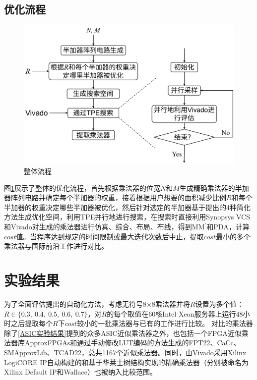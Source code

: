 \subsection{优化流程}


\begin{figure}[!htbp]
    \centering
    \includegraphics[width=0.8\linewidth]{./figs/AC-AM-FPGA-AMG-flow.pdf}
    \caption{整体流程}
    \label{AC:AM:FPGA:AMG:Fig:flow}
\end{figure}

图\ref{AC:AM:FPGA:AMG:Fig:flow}展示了整体的优化流程，首先根据乘法器的位宽$N$和$M$生成精确乘法器的半加器阵列电路并确定每个半加器的权重，接着根据用户想要的面积减少比例$R$和每个半加器的权重决定哪些半加器被优化，然后针对选定的半加器基于提出的4种简化方法生成优化空间，利用TPE并行地进行搜索，在搜索时直接利用Synopsys VCS和Vivado对生成的乘法器进行仿真、综合、布局、布线，得到$\text{MM}^{\prime}$和PDA，计算$cost$值。当程序达到规定的时间限制或最大迭代次数后中止，提取$cost$最小的多个乘法器与国际前沿工作进行对比。

\section{实验结果}

为了全面评估提出的自动化方法，考虑无符号8$\times$8乘法器并将$R$设置为多个值：$R \in \{ 0.3,\ 0.4,\ 0.5,\ 0.6,\ 0.7 \}$，对$R$的每个取值在60核Intel Xeon服务器上运行48小时之后提取每个$R$下$cost$较小的一批乘法器与已有的工作进行比较。
对比的乘法器除了\ref{ASIC实验结果}提到的众多ASIC近似乘法器之外，也包括一个FPGA近似乘法器库ApproxFPGAs\cite{AC:AM:FPGA:ApproxFPGAs}和通过手动修改LUT编码的方法生成的FPT22\cite{AC:AM:FPGA:FPT22}、CaCc\cite{AC:AM:FPGA:CaCc}、SMApproxLib\cite{AC:AM:FPGA:SMApproxLib}、TCAD22\cite{AC:AM:FPGA:TCAD22}，总共1167个近似乘法器。同时，由Vivado采用Xilinx LogiCORE IP\cite{IP:LogiCORE}自动构建的和基于华莱士树结构实现的精确乘法器（分别被命名为Xilinx Default IP和Wallace）也被纳入比较范围。

